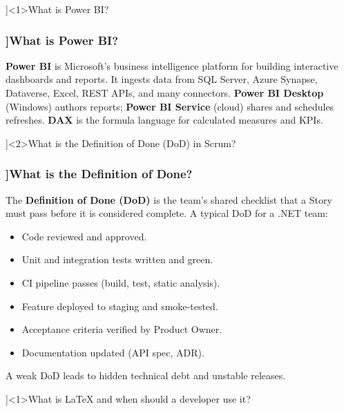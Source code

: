 \QuestionSlide[\CategoryBadge[ToolingColor!20]{Tooling \& Agile}]<1>{What is Power BI?}

\begin{frame}[fragile]
  \frametitle{\AnswerTitle[\CategoryBadge[ToolingColor!20]{Tooling \& Agile}]{What is Power BI?}}

  {\footnotesize
  \textbf{Power BI} is Microsoft's business intelligence platform for building interactive dashboards and reports. It ingests data from SQL Server, Azure Synapse, Dataverse, Excel, REST APIs, and many connectors. \textbf{Power BI Desktop} (Windows) authors reports; \textbf{Power BI Service} (cloud) shares and schedules refreshes. \textbf{DAX} is the formula language for calculated measures and KPIs.
  }
\end{frame}

\QuestionSlide[\CategoryBadge[ToolingColor!20]{Tooling \& Agile}]<2>{What is the Definition of Done (DoD) in Scrum?}

\begin{frame}[fragile]
  \frametitle{\AnswerTitle[\CategoryBadge[ToolingColor!20]{Tooling \& Agile}]{What is the Definition of Done?}}

  {\footnotesize
  The \textbf{Definition of Done (DoD)} is the team's shared checklist that a Story must pass before it is considered complete. A typical DoD for a .NET team:
  \begin{itemize}
    \item Code reviewed and approved.
    \item Unit and integration tests written and green.
    \item CI pipeline passes (build, test, static analysis).
    \item Feature deployed to staging and smoke-tested.
    \item Acceptance criteria verified by Product Owner.
    \item Documentation updated (API spec, ADR).
  \end{itemize}
  A weak DoD leads to hidden technical debt and unstable releases.
  }
\end{frame}

\QuestionSlide[\CategoryBadge[ToolingColor!20]{Tooling \& Agile}]<1>{What is LaTeX and when should a developer use it?}

